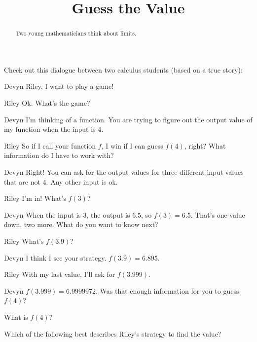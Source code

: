 \documentclass{ximera}
\title[Break-Ground:]{Guess the Value}
\begin{document}
\begin{abstract}
  Two young mathematicians think about limits.
\end{abstract}
\maketitle

Check out this dialogue between two calculus students (based on a true
story):

\begin{dialogue}
	\item[Devyn] Riley, I want to play a game!
	\item[Riley]  Ok.  What's the game?
	\item[Devyn] I'm thinking of a function.  You are trying to figure out the output value of my function when the input is $4$.
	\item[Riley] So if I call your function $f$, I win if I can guess $f(4)$, right?  What information do I have to work with?
	\item[Devyn] Right!  You can ask for the output values for three different input values that are not $4$.  Any other input is ok.
	\item[Riley] I'm in!  What's $f(3)$?
	\item[Devyn] When the input is $3$, the output is $6.5$, so $f(3) = 6.5$.  That's one value down, two more.  What do you want to know next?
	\item[Riley] What's $f(3.9)$?
	\item[Devyn] I think I see your strategy.  $f(3.9) = 6.895$.
	\item[Riley] With my last value, I'll ask for $f(3.999)$.
	\item[Devyn] $f(3.999) = 6.9999972$.  Was that enough information for you to guess $f(4)$?
\end{dialogue}

\begin{problem}
What is $f(4)$?
  \begin{multipleChoice}
  \end{multipleChoice}
\end{problem}

\begin{problem}
  Which of the following best describes Riley's strategy to find the value?
  \begin{multipleChoice}
  \end{multipleChoice}
\end{problem}
\end{document}
